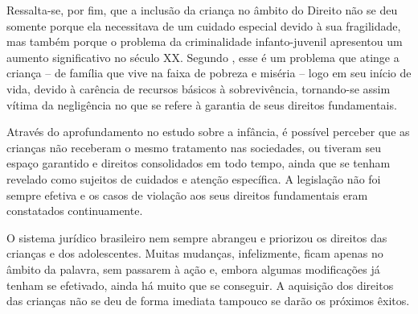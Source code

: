 Ressalta-se, por fim, que a inclusão da criança no âmbito do Direito não se deu somente porque ela necessitava de um cuidado especial devido à sua fragilidade, mas também porque o problema da criminalidade infanto-juvenil apresentou um aumento significativo no século XX. Segundo , esse é um problema que atinge a criança -- de família que vive na faixa de pobreza e miséria -- logo em seu início de vida, devido à carência de recursos básicos à sobrevivência, tornando-se assim vítima da negligência no que se refere à garantia de seus direitos fundamentais. 

Através do aprofundamento no estudo sobre a infância, é possível perceber que as crianças não receberam o mesmo tratamento nas sociedades, ou tiveram seu espaço garantido e direitos consolidados em todo tempo, ainda que se tenham revelado como sujeitos de cuidados e atenção específica. A legislação não foi sempre efetiva e os casos de violação aos seus direitos fundamentais eram constatados continuamente. 

O sistema jurídico brasileiro nem sempre abrangeu e priorizou os direitos das crianças e dos adolescentes. Muitas mudanças, infelizmente, ficam apenas no âmbito da palavra, sem passarem à ação e, embora algumas modificações já tenham se efetivado, ainda há muito que se conseguir. A aquisição dos direitos das crianças não se deu de forma imediata tampouco se darão os próximos êxitos. 